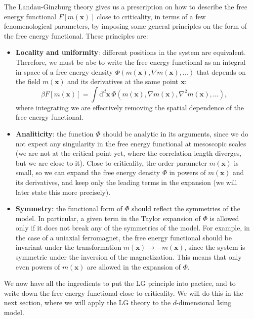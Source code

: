 The Landau-Ginzburg theory gives us a prescription on how to describe the free energy functional \(F[m(\mathbf{x})]\) close to criticality, in terms of a few fenomenological parameters, by imposing some general principles on the form of the free energy functional. These principles are:
\begin{itemize}
    \item \textbf{Locality and uniformity}: different positions in the system are equivalent. Therefore, we must be abe to write the free energy functional as an integral in space of a free energy density \(\Phi(m(\mathbf{x}), \nabla m(\mathbf{x}), \dots)\) that depends on the field \(m(\mathbf{x})\) and its derivatives at the same point \(\mathbf{x}\):
          \[
              \beta F[m(\mathbf{x})] = \int \mathrm{d}^d \mathbf{x}\, \Phi(m(\mathbf{x}), \nabla m(\mathbf{x}), \nabla^2 m(\mathbf{x}), \dots),
          \]
          where integrating we are effectively removing the spatial dependence of the free energy functional.
    \item \textbf{Analiticity}: the function \(\Phi\) should be analytic in its arguments, since we do not expect any singularity in the free energy functional at mesoscopic scales (we are not at the critical point yet, where the correlation length diverges, but we are close to it). Close to criticality, the order parameter \(m(\mathbf{x})\) is small, so we can expand the free energy density \(\Phi\) in powers of \(m(\mathbf{x})\) and its derivatives, and keep only the leading terms in the expansion (we will later state this more precisely).
    \item \textbf{Symmetry}: the functional form of \(\Phi\) should reflect the symmetries of the model. In particular, a given term in the Taylor expansion of \(\Phi\) is allowed only if it does not break any of the symmetries of the model. For example, in the case of a uniaxial ferromagnet, the free energy functional should be invariant under the transformation \(m(\mathbf{x}) \to -m(\mathbf{x})\), since the system is symmetric under the inversion of the magnetization. This means that only even powers of \(m(\mathbf{x})\) are allowed in the expansion of \(\Phi\).
\end{itemize}

We now have all the ingredients to put the LG principle into pactice, and to write down the free energy functional close to criticality. We will do this in the next section, where we will apply the LG theory to the \(d\)-dimensional Ising model.

